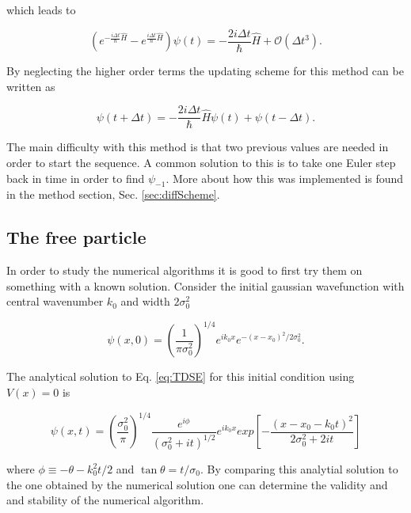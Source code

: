 which leads to

\begin{equation}
\label{eq:diffSchemeStepper}
   (e^{-\frac{i\Delta t}{\hbar}\hat{H}}-e^{\frac{i\Delta t}{\hbar}\hat{H}})\psi(t) = - \frac{2i\Delta t}{\hbar}\hat H + \mathcal O(\Delta t^3).
\end{equation}

By neglecting the higher order terms the updating scheme for this method can be written as

\begin{equation}
  \label{eq:diffScheme}
  \psi(t+\Delta t) = -\frac{2i\Delta t}{\hbar}\hat H \psi(t) + \psi(t-\Delta t).
\end{equation}

The main difficulty with this method is that two previous values are needed in order to start the sequence. A common solution to this is to take one Euler step back in time in order to find $\psi_{-1}$. More about how this was implemented is found in the method section, Sec. \ref{sec:diffScheme}.

\subsection{The free particle}

In order to study the numerical algorithms it is good to first try them on something with a known solution. Consider the initial gaussian wavefunction with central wavenumber $k_0$ and width $2\sigma_0^2$

\begin{equation}
  \label{eq:init}
  \psi(x,0) = \left( \frac{1}{\pi \sigma_0^2} \right)^{1/4} e^{ik_0x}e^{-(x-x_0)^2/2\sigma_0^2}.
\end{equation}

The analytical solution to Eq. \eqref{eq:TDSE} for this initial condition using $V(x)=0$ is

\begin{equation}
  \label{eq:free}
  \psi(x,t) = \left(\frac{\sigma_0^2}{\pi}\right)^{1/4} \frac{e^{i\phi}}{(\sigma_0^2 + it)^{1/2}} e^{ik_0x} exp \left[ - \frac{(x-x_0-k_0t)^2}{2\sigma_0^2 + 2it}\right]
\end{equation}

where $\phi \equiv -\theta -k_0^2t/2$ and $\tan \theta = t/\sigma_0$\cite{sakurai}. By comparing this analytial solution to the one obtained by the numerical solution one can determine the validity and and stability of the numerical algorithm.


